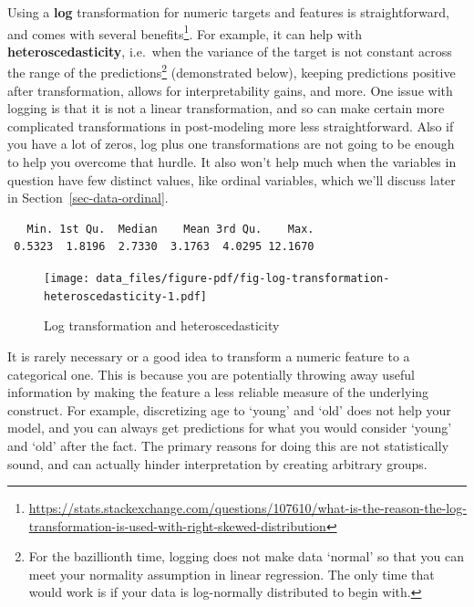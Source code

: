 \documentclass[
  letterpaper,
]{krantz}
\DeclareRobustCommand{\href}[2]{#2\footnote{\url{#1}}}
\begin{document}
Using a \textbf{log} transformation for numeric targets and features is
straightforward, and
\href{https://stats.stackexchange.com/questions/107610/what-is-the-reason-the-log-transformation-is-used-with-right-skewed-distribution}{comes
with several benefits}. For example, it can help with
\textbf{heteroscedasticity}, i.e.~when the variance of the target is not
constant across the range of the predictions\footnote{For the
  bazillionth time, logging does not make data `normal' so that you can
  meet your normality assumption in linear regression. The only time
  that would work is if your data is log-normally distributed to begin
  with.} (demonstrated below), keeping predictions positive after
transformation, allows for interpretability gains, and more. One issue
with logging is that it is not a linear transformation, and so can make
certain more complicated transformations in post-modeling more less
straightforward. Also if you have a lot of zeros, log plus one
transformations are not going to be enough to help you overcome that
hurdle. It also won't help much when the variables in question have few
distinct values, like ordinal variables, which we'll discuss later in
Section~\ref{sec-data-ordinal}.

\begin{verbatim}
   Min. 1st Qu.  Median    Mean 3rd Qu.    Max. 
 0.5323  1.8196  2.7330  3.1763  4.0295 12.1670 
\end{verbatim}

\begin{figure}

{\centering \texttt{[image: data\_files/figure-pdf/fig-log-transformation-heteroscedasticity-1.pdf]}

}

\caption{\label{fig-log-transformation-heteroscedasticity}Log
transformation and heteroscedasticity}

\end{figure}

\begin{tcolorbox}[enhanced jigsaw, toprule=.15mm, arc=.35mm, rightrule=.15mm, bottomrule=.15mm, leftrule=.75mm, breakable, colframe=quarto-callout-tip-color-frame, colback=white, left=2mm, opacityback=0]
\begin{minipage}[t]{5.5mm}
\textcolor{quarto-callout-tip-color}{\faLightbulb}
\end{minipage}%
\begin{minipage}[t]{\textwidth - 5.5mm}

It is rarely necessary or a good idea to transform a numeric feature to
a categorical one. This is because you are potentially throwing away
useful information by making the feature a less reliable measure of the
underlying construct. For example, discretizing age to `young' and `old'
does not help your model, and you can always get predictions for what
you would consider `young' and `old' after the fact. The primary reasons
for doing this are not statistically sound, and can actually hinder
interpretation by creating arbitrary groups.

\end{minipage}%
\end{tcolorbox}
\end{document}
